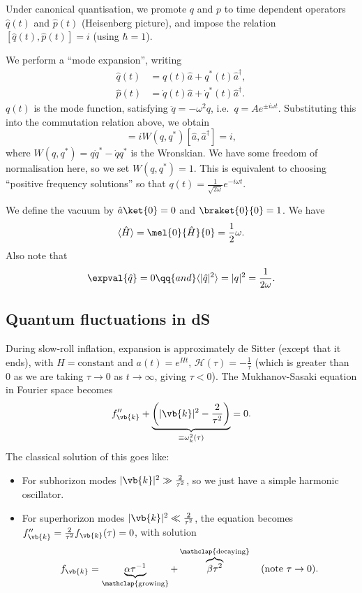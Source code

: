 \documentclass{jknotes}
\begin{document}
Under canonical quantisation, we promote \(q\) and \(p\) to time dependent operators \(\hat{q}(t)\) and \(\hat{p}(t)\) (Heisenberg picture), and impose the relation \([\hat{q}(t),\hat{p}(t)] = i\) (using \(\hbar = 1\)).

We perform a ``mode expansion'', writing
\begin{align}
    \hat{q}(t) &= q(t)\hat{a} + q^*(t)\hat{a}^\dagger, \\
    \hat{p}(t) &= \dot{q}(t)\hat{a} + \dot{q}^*(t)\hat{a}^\dagger.
\end{align}
\(q(t)\) is the mode function, satisfying \(\ddot{q} = -\omega^2q\), i.e.\ \(q=Ae^{\pm i\omega t}\). Substituting this into the commutation relation above, we obtain
\begin{equation}
    [\hat{q},\hat{p}] = iW(q,q^*)[\hat{a},\hat{a}^\dagger] = i,
\end{equation}
where \(W(q,q^*) = q\dot{q}^* - \dot{q}q^*\) is the Wronskian. We have some freedom of normalisation here, so we set \(W(q,q^*) = 1\). This is equivalent to choosing ``positive frequency solutions'' so that \(q(t) = \frac1{\sqrt{2\omega}}e^{-i\omega t}\). 

We define the vacuum by \(\hat{a}\ket{0} = 0\) and \(\braket{0}{0}=1\). We have
\begin{equation}
    \langle\hat{H}\rangle = \mel{0}{\hat{H}}{0} = \frac12 \omega.
\end{equation}
Also note that
\begin{equation}
    \expval{\hat{q}} = 0 \qq{and} \langle|\hat{q}|^2\rangle = |q|^2 = \frac1{2\omega}.
\end{equation}

\subsection{Quantum fluctuations in dS}
During slow-roll inflation, expansion is approximately de Sitter (except that it ends), with \(H=\text{constant}\) and \(a(t) = e^{Ht}\), \(\mathcal{H}(\tau) = -\frac1\tau\) (which is greater than 0 as we are taking \(\tau \to 0\) as \(t \to \infty\), giving \(\tau < 0\)). The Mukhanov-Sasaki equation in Fourier space becomes
\begin{equation}
    f''_{\vb{k}} + \underbrace{\left(|\vb{k}|^2-\frac2{\tau^2}\right)}_{\equiv\omega_k^2(\tau)} = 0.
\end{equation}
The classical solution of this goes like:
\begin{itemize}
    \item For subhorizon modes \(|\vb{k}|^2 \gg \frac2{\tau^2}\), so we just have a simple harmonic oscillator.
    \item For superhorizon modes \(|\vb{k}|^2 \ll \frac2{\tau^2}\), the equation becomes \(f''_{\vb{k}} = \frac2{\tau^2}f_{\vb{k}}(\tau) = 0\), with solution
        \begin{equation}
            f_{\vb{k}} = \underbrace{\alpha\tau^{-1}}_{\mathclap{\text{growing}}} + \overbrace{\beta\tau^2}^{\mathclap{\text{decaying}}} \quad \text{(note \(\tau \to 0\)).}
        \end{equation}
\end{itemize}
\end{document}
